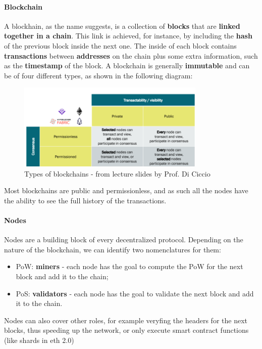 \documentclass[12pt,a4paper,oneside]{article}
\theoremstyle{definition}
\begin{document}
\paragraph{Blockchain} A blockhain, as the name suggests, is a collection of \textbf{blocks} that are \textbf{linked together in a chain}. This link is achieved, for instance, by including the \textbf{hash} of the previous block inside the next one. The inside of each block contains \textbf{transactions} between \textbf{addresses} on the chain plus some extra information, such as the \textbf{timestamp} of the block. A blockchain is generally \textbf{immutable} and can be of four different types, as shown in the following diagram: 
\begin{figure}
  \centering
  \includegraphics[width=0.8\textwidth]{figures/bt_types.png}
  \caption{Types of blockchains - from lecture slides by Prof. Di Ciccio}
  \label{fig:blockchain_types}
\end{figure}
Most blockchains are public and permissionless, and as such all the nodes have the ability to see the full history of the transactions.


\paragraph{Nodes} Nodes are a building block of every decentralized protocol. Depending on the nature of the blockchain, we can identify two nomenclatures for them:
\begin{itemize}
  \item PoW: \textbf{miners} - each node has the goal to compute the PoW for the next block and add it to the chain;
  \item PoS: \textbf{validators} - each node has the goal to validate the next block and add it to the chain.
\end{itemize}
Nodes can also cover other roles, for example veryfing the headers for the next blocks, thus speeding up the network, or only execute smart contract functions (like shards in eth 2.0) \\
\end{document}
